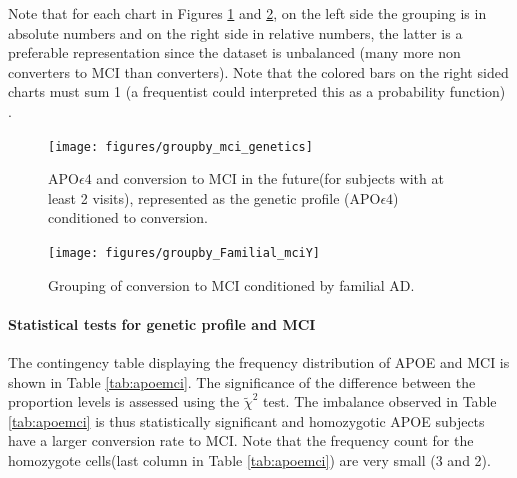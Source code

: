 \documentclass[11pt]{article}
\theoremstyle{definition}
\theoremstyle{remark}
\begin{document}
Note that for each chart in Figures \ref{fig:groupby_mci_genetics} and  \ref{fig:groupby_mci_fami}, on the left side the grouping is in absolute numbers and on the right side in relative numbers, the latter is a preferable representation since the dataset is unbalanced (many more non converters to MCI than converters). Note that the colored bars on the right sided charts must sum 1 (a frequentist could interpreted this as a probability function) \cite{Gomez-ramirez_limitations_2013}. 
\begin{figure}[H]
        \centering
        \texttt{[image: figures/groupby\_mci\_genetics]}
        \caption{APO$\epsilon4$ and conversion to MCI in the future(for subjects with at least 2 visits), represented as the genetic profile (APO$\epsilon4$) conditioned to conversion.} 
        \label{fig:groupby_mci_genetics}
\end{figure}

\begin{figure}[H]
        \centering
        \texttt{[image: figures/groupby\_Familial\_mciY]}
        \caption{Grouping of conversion to MCI conditioned by familial AD.} 
        \label{fig:groupby_mci_fami}
\end{figure}

\paragraph*{Statistical tests for genetic profile and MCI}

The contingency table displaying the frequency distribution of APOE and MCI is shown in Table \ref{tab:apoemci}. The significance of the difference between the proportion levels is assessed using the $\tilde{\chi}^2$ test. The imbalance observed in Table \ref{tab:apoemci} is thus statistically significant and homozygotic APOE subjects have a larger conversion rate to MCI. Note that the frequency count for the homozygote cells(last column in Table \ref{tab:apoemci}) are very small (3 and 2). 
\end{document}
